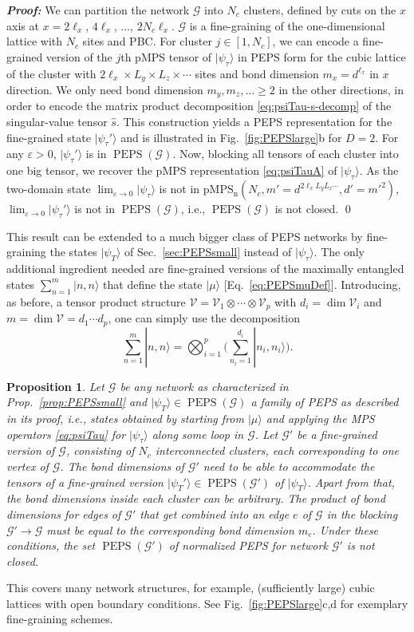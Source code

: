 \documentclass[english,11pt,aps,pra,onecolumn,tightenlines,groupedaddress,superscriptaddress,notitlepage,floatfix,fleqn]{revtex4-1}
\newcommand{\ket}{\rangle}
\newcommand{\mc}[1]{\mathcal{#1}}
\newcommand{\V}{\mc{V}}
\newcommand{\G}{\mc{G}}
\newcommand{\pMPSn}{\operatorname{pMPS_n}}
\newcommand{\PEPS}{\operatorname{PEPS}}
\newcommand{\veps}{\varepsilon}
\newcommand{\Emph}[1]{\textbf{\emph{#1}}}
\newtheorem{prop}{Proposition}
\begin{document}
\Emph{Proof:}
We can partition the network $\G$ into $N_c$ clusters, defined by cuts on the $x$ axis at $x=2\ell_x$, $4\ell_x$, $\dots$, $2N_c\ell_x$. $\G$ is a fine-graining of the one-dimensional lattice with $N_c$ sites and PBC. For cluster $j\in[1,N_c]$, we can encode a fine-grained version of the $j$th pMPS tensor of $|\psi_\tau\ket$ in PEPS form for the cubic lattice of the cluster with $2\ell_x\times L_y\times L_z\times \dotsb$ sites and bond dimension $m_x=d^{\ell_x}$ in $x$ direction. We only need bond dimension $m_y,m_z,\dotsc\geq 2$ in the other directions, in order to encode the matrix product decomposition \eqref{eq:psiTau-s-decomp} of the singular-value tensor $\hat{s}$. This construction yields a PEPS representation for the fine-grained state $|\psi_\tau'\ket$ and is illustrated in Fig.~\ref{fig:PEPSlarge}b for $D=2$. For any $\veps>0$, $|\psi_\tau'\ket$ is in $\PEPS(\G)$.
Now, blocking all tensors of each cluster into one big tensor, we recover the pMPS representation \eqref{eq:psiTauA} of $|\psi_\tau\ket$. As the two-domain state $\lim_{\veps\to 0}|\psi_\tau\ket$ is not in $\pMPSn(N_c,m'=d^{2\ell_x L_y L_z\dotsb},d'=m'^{2})$, $\lim_{\veps\to 0}|\psi_\tau'\ket$ is not in $\PEPS(\G)$, i.e., $\PEPS(\G)$ is not closed. \qed

This result can be extended to a much bigger class of PEPS networks by fine-graining the states $|\psi_T\ket$ of Sec.~\ref{sec:PEPSsmall} instead of $|\psi_\tau\ket$. The only additional ingredient needed are fine-grained versions of the maximally entangled states $\sum_{n=1}^m|n,n\ket$ that define the state $|\mu\ket$ [Eq.~\eqref{eq:PEPSmuDef}]. Introducing, as before, a tensor product structure $\V=\V_1\otimes\dotsb\otimes \V_p$ with $d_i=\dim\V_i$ and $m=\dim\V=d_1\dotsb d_p$, one can simply use the decomposition
\begin{equation}\textstyle
	\sum_{n=1}^m|n,n\ket=\bigotimes_{i=1}^p\big(\sum_{n_i=1}^{d_i}|n_i,n_i\ket\big).
\end{equation}
\begin{prop}\label{prop:PEPSbig2}
Let $\G$ be any network as characterized in Prop.~\ref{prop:PEPSsmall} and $|\psi_T\ket\in \PEPS(\G)$ a family of PEPS as described in its proof, i.e., states obtained by starting from $|\mu\ket$  and applying the MPS operators \eqref{eq:psiTau} for $|\psi_\tau\ket$ along some loop in $\G$. Let $\G'$ be a fine-grained version of $\G$, consisting of $N_c$ interconnected clusters, each corresponding to one vertex of $\G$. The bond dimensions of $\G'$ need to be able to accommodate the tensors of a fine-grained version $|\psi_T'\ket\in \PEPS(\G')$ of $|\psi_T\ket$. Apart from that, the bond dimensions inside each cluster can be arbitrary. The product of bond dimensions for edges of $\G'$ that get combined into an edge $e$ of $\G$ in the blocking $\G'\to\G$ must be equal to the corresponding bond dimension $m_e$. Under these conditions, the set $\PEPS(\G')$ of normalized PEPS for network $\G'$ is not closed.
\end{prop}
This covers many network structures, for example, (sufficiently large) cubic lattices with open boundary conditions. See Fig.~\ref{fig:PEPSlarge}c,d for exemplary fine-graining schemes.
\end{document}
